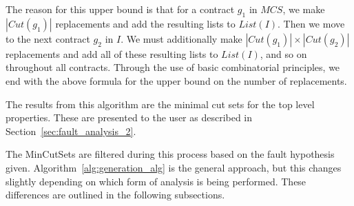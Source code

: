 The reason for this upper bound is that for a contract $g_1$ in $MCS$, we make $|Cut(g_1)|$ replacements and add the resulting lists to $List(I)$. Then we move to the next contract $g_2$ in $I$. We must additionally make $|Cut(g_1)| \times |Cut(g_2)|$ replacements and add all of these resulting lists to $List(I)$, and so on throughout all contracts. Through the use of basic combinatorial principles, we end with the above formula for the upper bound on the number of replacements. 


The results from this algorithm are the minimal cut sets for the top level properties. These are presented to the user as described in Section~\ref{sec:fault_analysis_2}.

The MinCutSets are filtered during this process based on the fault hypothesis given. Algorithm~\ref{alg:generation_alg} is the general approach, but this changes slightly depending on which form of analysis is being performed. These differences are outlined in the following subsections.


































